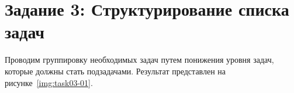 \section{Задание 3: Структурирование списка задач}

Проводим группировку необходимых задач путем понижения уровня задач, которые
должны стать подзадачами. Результат представлен на рисунке~\ref{img:task03-01}.

